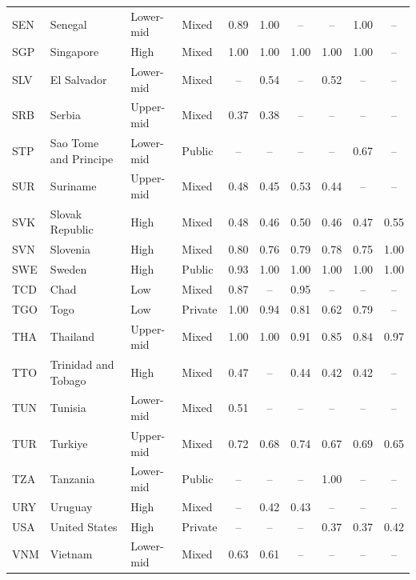 \documentclass[11pt,letterpaper]{article}
\begin{document}
\begin{longtable}{@{}llllcccccc@{}}
SEN & Senegal & Lower-mid & Mixed & 0.89 & 1.00 & -- & -- & 1.00 & -- \\
SGP & Singapore & High & Mixed & 1.00 & 1.00 & 1.00 & 1.00 & 1.00 & -- \\
SLV & El Salvador & Lower-mid & Mixed & -- & 0.54 & -- & 0.52 & -- & -- \\
SRB & Serbia & Upper-mid & Mixed & 0.37 & 0.38 & -- & -- & -- & -- \\
STP & Sao Tome and Principe & Lower-mid & Public & -- & -- & -- & -- & 0.67 & -- \\
SUR & Suriname & Upper-mid & Mixed & 0.48 & 0.45 & 0.53 & 0.44 & -- & -- \\
SVK & Slovak Republic & High & Mixed & 0.48 & 0.46 & 0.50 & 0.46 & 0.47 & 0.55 \\
SVN & Slovenia & High & Mixed & 0.80 & 0.76 & 0.79 & 0.78 & 0.75 & 1.00 \\
SWE & Sweden & High & Public & 0.93 & 1.00 & 1.00 & 1.00 & 1.00 & 1.00 \\
TCD & Chad & Low & Mixed & 0.87 & -- & 0.95 & -- & -- & -- \\
TGO & Togo & Low & Private & 1.00 & 0.94 & 0.81 & 0.62 & 0.79 & -- \\
THA & Thailand & Upper-mid & Mixed & 1.00 & 1.00 & 0.91 & 0.85 & 0.84 & 0.97 \\
TTO & Trinidad and Tobago & High & Mixed & 0.47 & -- & 0.44 & 0.42 & 0.42 & -- \\
TUN & Tunisia & Lower-mid & Mixed & 0.51 & -- & -- & -- & -- & -- \\
TUR & Turkiye & Upper-mid & Mixed & 0.72 & 0.68 & 0.74 & 0.67 & 0.69 & 0.65 \\
TZA & Tanzania & Lower-mid & Public & -- & -- & -- & 1.00 & -- & -- \\
URY & Uruguay & High & Mixed & -- & 0.42 & 0.43 & -- & -- & -- \\
USA & United States & High & Private & -- & -- & -- & 0.37 & 0.37 & 0.42 \\
VNM & Vietnam & Lower-mid & Mixed & 0.63 & 0.61 & -- & -- & -- & -- \\
\end{longtable}
\normalsize
\end{document}
